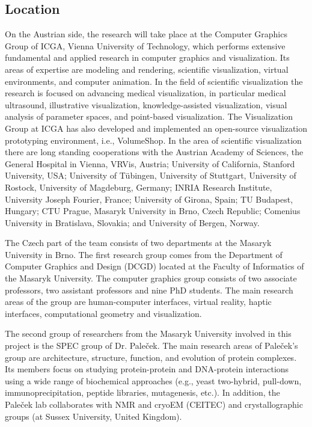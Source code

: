 \documentclass[11pt,a4paper,titlepage,oneside,onecolumn]{article}
\begin{document}
\subsection{Location}
On the Austrian side, the research will take place at the Computer Graphics Group of ICGA, Vienna University of Technology, which performs extensive fundamental and applied research in computer graphics and visualization. 
Its areas of expertise are modeling and rendering, scientific visualization, virtual environments, and computer animation. In the field of scientific visualization the research is focused on advancing medical visualization, in particular medical ultrasound, illustrative visualization, knowledge-assisted visualization, visual analysis of parameter spaces, and point-based visualization. The Visualization Group at ICGA has also developed and implemented an open-source visualization prototyping environment, i.e., VolumeShop. In the area of scientific visualization there are long standing cooperations with the Austrian Academy of Sciences, the General Hospital in Vienna, VRVis, Austria; University of California, Stanford University, USA; University of T\"{u}bingen, University of Stuttgart, University of Rostock, University of Magdeburg, Germany; INRIA Research Institute, University Joseph Fourier, France;  University of Girona, Spain; TU Budapest, Hungary; CTU Prague, Masaryk University in Brno, Czech Republic; Comenius University in Bratislava, Slovakia; and University of Bergen, Norway.

The Czech part of the team consists of two departments at the Masaryk University in Brno.
The first research group comes from the Department of Computer Graphics and Design (DCGD) located at the Faculty of Informatics of the Masaryk University. 
The computer graphics group consists of two associate professors, two assistant professors and nine PhD students. 
The main research areas of the group are human-computer interfaces, virtual reality, haptic interfaces, computational geometry and visualization. 

The second group of researchers from the Masaryk University involved in this project is the SPEC group of Dr. Pale\v{c}ek. 
The main research areas of Pale\v{c}ek's group are architecture, structure, function, and evolution of protein complexes.
Its members focus on studying protein-protein and DNA-protein interactions using a wide range of biochemical approaches (e.g., yeast two-hybrid, pull-down, immunoprecipitation, peptide libraries, mutagenesis, etc.). 
In addition, the Pale\v{c}ek lab collaborates with NMR and cryoEM (CEITEC) and crystallographic groups (at Sussex University, United Kingdom). 
\end{document}
